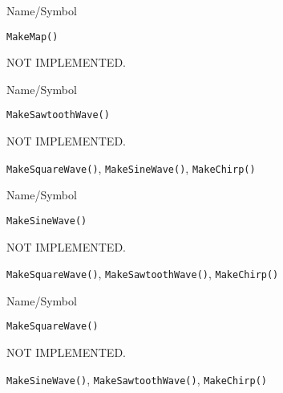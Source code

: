 \rl




\begin{desc}{Name/Symbol}
\item[Name/Symbol]	\verb+MakeMap()+

\item[Description]	NOT IMPLEMENTED.

\item[Usage]		

\item[Example]	

\item[See Also]	
\end{desc}

\rl


\begin{desc}{Name/Symbol}
\item[Name/Symbol]	\verb+MakeSawtoothWave()+   

\item[Description]	NOT IMPLEMENTED.

\item[Usage]		

\item[Example]	

\item[See Also]	\verb+MakeSquareWave()+, \verb+MakeSineWave()+, \verb+MakeChirp()+
\end{desc}

\rl


\begin{desc}{Name/Symbol}
\item[Name/Symbol]	\verb+MakeSineWave()+    

\item[Description]	NOT IMPLEMENTED.

\item[Usage]		

\item[Example]	

\item[See Also]	\verb+MakeSquareWave()+, \verb+MakeSawtoothWave()+, \verb+MakeChirp()+
\end{desc}

\rl


\begin{desc}{Name/Symbol}
\item[Name/Symbol]	\verb+MakeSquareWave()+     

\item[Description]	NOT IMPLEMENTED.

\item[Usage]		

\item[Example]	

\item[See Also]	\verb+MakeSineWave()+, \verb+MakeSawtoothWave()+, \verb+MakeChirp()+
\end{desc}

